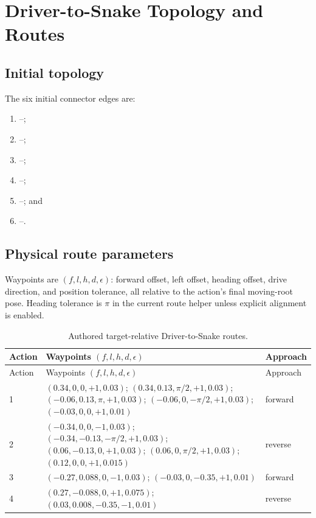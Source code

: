 \section{Driver-to-Snake Topology and Routes}
\label{app:routes}

\subsection{Initial topology}

The six initial connector edges are:

\begin{enumerate}
  \item {}--;
  \item {}--;
  \item {}--;
  \item {}--;
  \item {}--; and
  \item {}--.
\end{enumerate}

\subsection{Physical route parameters}

Waypoints are $(f,l,h,d,\epsilon)$: forward offset, left offset, heading offset,
drive direction, and position tolerance, all relative to the action's final moving-root
pose. Heading tolerance is $\pi$ in the current route helper unless explicit alignment
is enabled.

\begin{longtable}{L{0.08\textwidth}L{0.72\textwidth}L{0.10\textwidth}}
\caption{Authored target-relative Driver-to-Snake routes.}
\label{tab:route-details}\\
\toprule
Action & Waypoints $(f,l,h,d,\epsilon)$ & Approach \\
\midrule
\endfirsthead
\toprule
Action & Waypoints $(f,l,h,d,\epsilon)$ & Approach \\
\midrule
{} & $(0.34,0,0,+1,0.03)$; $(0.34,0.13,\pi/2,+1,0.03)$;
$(-0.06,0.13,\pi,+1,0.03)$; $(-0.06,0,-\pi/2,+1,0.03)$;
$(-0.03,0,0,+1,0.01)$ & forward \\
2 & $(-0.34,0,0,-1,0.03)$; $(-0.34,-0.13,-\pi/2,+1,0.03)$;
$(0.06,-0.13,0,+1,0.03)$; $(0.06,0,\pi/2,+1,0.03)$;
$(0.12,0,0,+1,0.015)$ & reverse \\
3 & $(-0.27,0.088,0,-1,0.03)$; $(-0.03,0,-0.35,+1,0.01)$ & forward \\
4 & $(0.27,-0.088,0,+1,0.075)$; $(0.03,0.008,-0.35,-1,0.01)$ & reverse \\
\bottomrule
\end{longtable}

